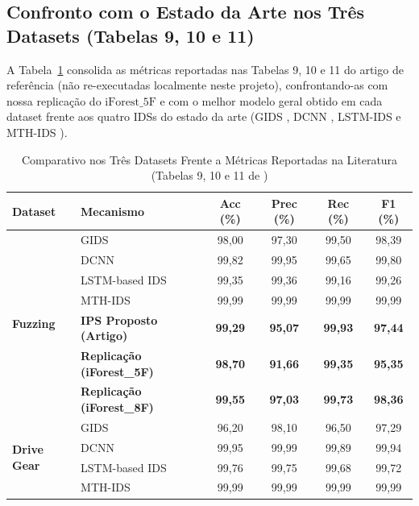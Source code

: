 \documentclass[conference]{IEEEtran}
\begin{document}
\subsection{Confronto com o Estado da Arte nos Três Datasets (Tabelas 9, 10 e 11)}
A Tabela~\ref{tab:sota_comparison} consolida as métricas reportadas nas Tabelas 9, 10 e 11 do artigo de referência (não re-executadas localmente neste projeto), confrontando-as com nossa replicação do $\text{iForest\_5F}$ e com o melhor modelo geral obtido em cada dataset frente aos quatro IDSs do estado da arte (GIDS \cite{seo2018gids}, DCNN \cite{song2020invehicle}, LSTM-IDS \cite{song2020invehicle} e MTH-IDS \cite{yang2021mth}).

\begin{table}[htbp]
\caption{Comparativo nos Três Datasets Frente a Métricas Reportadas na Literatura (Tabelas 9, 10 e 11 de \cite{araujo2021efficient})}
\label{tab:sota_comparison}
\centering
\scriptsize
\setlength{\tabcolsep}{3pt}
\begin{tabular}{llcccc}
\toprule
\textbf{Dataset} & \textbf{Mecanismo} & \textbf{Acc (\%)} & \textbf{Prec (\%)} & \textbf{Rec (\%)} & \textbf{F1 (\%)} \\
\midrule
\multirow{7}{*}{\textbf{Fuzzing}} 
 & GIDS \cite{seo2018gids} & 98,00 & 97,30 & 99,50 & 98,39 \\
 & DCNN \cite{song2020invehicle} & 99,82 & 99,95 & 99,65 & 99,80 \\
 & LSTM-based IDS \cite{song2020invehicle} & 99,35 & 99,36 & 99,16 & 99,26 \\
 & MTH-IDS \cite{yang2021mth} & 99,99 & 99,99 & 99,99 & 99,99 \\
 & \textbf{IPS Proposto (Artigo)} & \textbf{99,29} & \textbf{95,07} & \textbf{99,93} & \textbf{97,44} \\
 & \textbf{Replicação (iForest\_5F)} & \textbf{98,70} & \textbf{91,66} & \textbf{99,35} & \textbf{95,35} \\
 & \textbf{Replicação (iForest\_8F)} & \textbf{99,55} & \textbf{97,03} & \textbf{99,73} & \textbf{98,36} \\
\midrule
\multirow{7}{*}{\textbf{Drive Gear}} 
 & GIDS \cite{seo2018gids} & 96,20 & 98,10 & 96,50 & 97,29 \\
 & DCNN \cite{song2020invehicle} & 99,95 & 99,99 & 99,89 & 99,94 \\
 & LSTM-based IDS \cite{song2020invehicle} & 99,76 & 99,75 & 99,68 & 99,72 \\
 & MTH-IDS \cite{yang2021mth} & 99,99 & 99,99 & 99,99 & 99,99 \\

\end{tabular}
\end{table}
\end{document}
